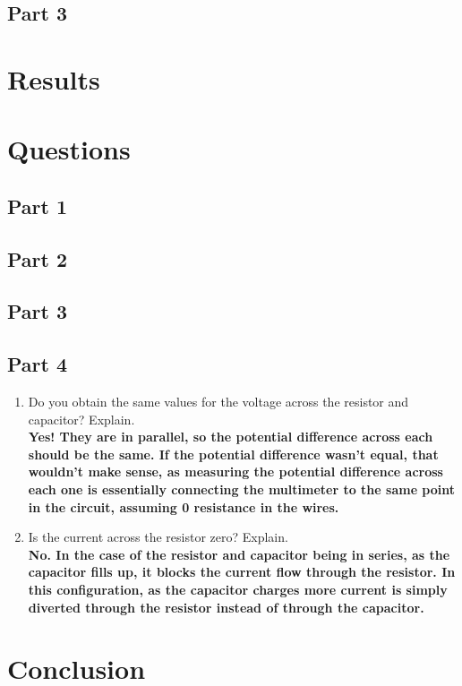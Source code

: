 \documentclass[titlepage]{article}
\begin{document}
	\subsection{Part 3}
	\section{Results}
	\section{Questions}


	\subsection{Part 1}

	\subsection{Part 2}

    \subsection{Part 3}
	
    \subsection{Part 4}
    \begin{enumerate}
        \item Do you obtain the same values for the voltage across the resistor and capacitor? Explain.\\ 
            \textbf{Yes! They are in parallel, so the potential difference across each should be the same. If the potential difference wasn’t equal, that wouldn’t make sense, as measuring the potential difference across each one is essentially connecting the multimeter to the same point in the circuit, assuming 0 resistance in the wires.}
        \item Is the current across the resistor zero? Explain.\\ 
            \textbf{No. In the case of the resistor and capacitor being in series, as the capacitor fills up, it blocks the current flow through the resistor. In this configuration, as the capacitor charges more current is simply diverted through the resistor instead of through the capacitor.}



    \end{enumerate}

	\section{Conclusion}
\end{document}

